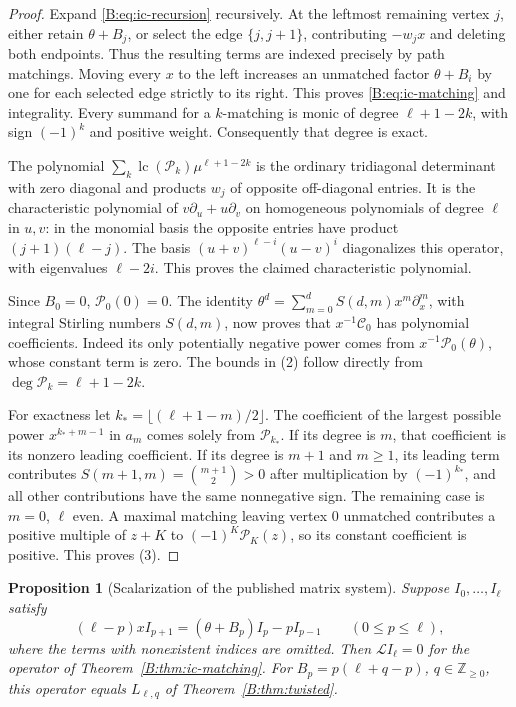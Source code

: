 \documentclass[11pt,a4paper]{article}
\newtheorem{proposition}[theorem]{Proposition}
\theoremstyle{definition}
\theoremstyle{remark}
\numberwithin{equation}{section}
\begin{document}
\begin{proof}
Expand \eqref{B:eq:ic-recursion} recursively.  At the leftmost remaining
vertex $j$, either retain $\theta+B_j$, or select the edge $\{j,j+1\}$,
contributing $-w_jx$ and deleting both endpoints.  Thus the resulting terms
are indexed precisely by path matchings.  Moving every $x$ to the left
increases an unmatched factor $\theta+B_i$ by one for each selected edge
strictly to its right.  This proves \eqref{B:eq:ic-matching} and integrality.
Every summand for a $k$-matching is monic of degree $\ell+1-2k$, with sign
$(-1)^k$ and positive weight.  Consequently that degree is exact.

The polynomial $\sum_k\operatorname{lc}(\mathcal P_k)\mu^{\ell+1-2k}$
is the ordinary tridiagonal determinant with zero diagonal and products
$w_j$ of opposite off-diagonal entries.  It is the characteristic polynomial
of $v\partial_u+u\partial_v$ on homogeneous polynomials of degree $\ell$
in $u,v$: in the monomial basis the opposite entries have product
$(j+1)(\ell-j)$.  The basis
$(u+v)^{\ell-i}(u-v)^i$ diagonalizes this operator, with eigenvalues
$\ell-2i$.  This proves the claimed characteristic polynomial.

Since $B_0=0$, $\mathcal P_0(0)=0$.  The identity
$\theta^d=\sum_{m=0}^d S(d,m)x^m\partial_x^m$, with integral Stirling
numbers $S(d,m)$, now proves that $x^{-1}\mathcal C_0$ has polynomial
coefficients.  Indeed its only potentially negative power comes from
$x^{-1}\mathcal P_0(\theta)$, whose constant term is zero.  The bounds
in (2) follow directly from $\deg\mathcal P_k=\ell+1-2k$.

For exactness let $k_* =\lfloor(\ell+1-m)/2\rfloor$.  The coefficient
of the largest possible power $x^{k_*+m-1}$ in $a_m$ comes solely from
$\mathcal P_{k_*}$.  If its degree is $m$, that coefficient is its nonzero
leading coefficient.  If its degree is $m+1$ and $m\ge1$, its leading
term contributes $S(m+1,m)=\binom{m+1}{2}>0$ after multiplication by
$(-1)^{k_*}$, and all other contributions have the same nonnegative sign.
The remaining case is $m=0$, $\ell$ even.  A maximal matching leaving
vertex $0$ unmatched contributes a positive multiple of $z+K$ to
$(-1)^K\mathcal P_K(z)$, so its constant coefficient is positive.
This proves (3).
\end{proof}

\begin{proposition}[Scalarization of the published matrix system]
\label{B:prop:ic-system}
Suppose $I_0,\ldots,I_\ell$ satisfy
\begin{equation}\label{B:eq:ic-system}
 (\ell-p)xI_{p+1}=(\theta+B_p)I_p-pI_{p-1}
       \qquad(0\le p\le\ell),
\end{equation}
where the terms with nonexistent indices are omitted.  Then
$\mathcal L I_\ell=0$ for the operator of Theorem~\ref{B:thm:ic-matching}.
For $B_p=p(\ell+q-p)$, $q\in\mathbb Z_{\ge0}$, this operator equals
$L_{\ell,q}$ of Theorem~\ref{B:thm:twisted}.
\end{proposition}
\end{document}
